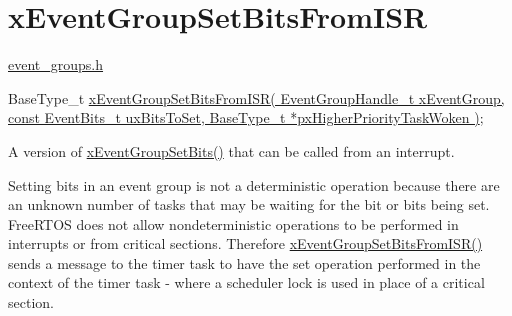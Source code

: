 \hypertarget{group__xEventGroupSetBitsFromISR}{\section{x\-Event\-Group\-Set\-Bits\-From\-I\-S\-R}
\label{group__xEventGroupSetBitsFromISR}
}
\hyperlink{event__groups_8h}{event\-\_\-groups.\-h} 
\begin{DoxyPre}
    BaseType\_t \hyperlink{event__groups_8h_a62b68278abac6358369ae8e390988a02}{xEventGroupSetBitsFromISR( EventGroupHandle\_t xEventGroup, const EventBits\_t uxBitsToSet, BaseType\_t *pxHigherPriorityTaskWoken )};
 \end{DoxyPre}


A version of \hyperlink{event__groups_8h_a02d7b3bb55f7e11d9c47116266c5fb2e}{x\-Event\-Group\-Set\-Bits()} that can be called from an interrupt.

Setting bits in an event group is not a deterministic operation because there are an unknown number of tasks that may be waiting for the bit or bits being set. Free\-R\-T\-O\-S does not allow nondeterministic operations to be performed in interrupts or from critical sections. Therefore \hyperlink{event__groups_8h_a62b68278abac6358369ae8e390988a02}{x\-Event\-Group\-Set\-Bits\-From\-I\-S\-R()} sends a message to the timer task to have the set operation performed in the context of the timer task -\/ where a scheduler lock is used in place of a critical section.


